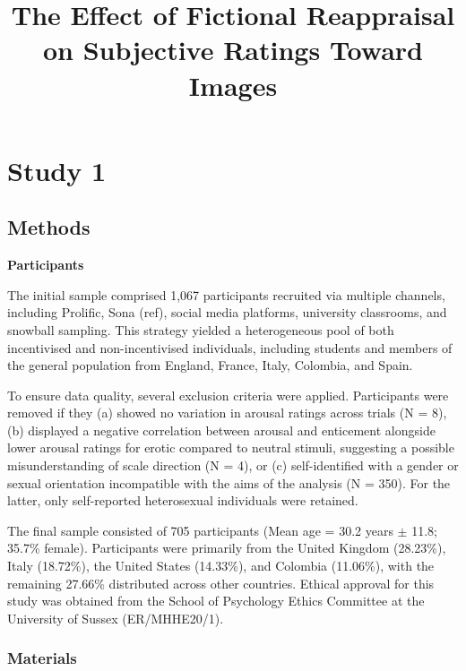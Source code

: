 \documentclass[
  jou,
  floatsintext,
  longtable,
  nolmodern,
  notxfonts,
  notimes,
  colorlinks=true,linkcolor=blue,citecolor=blue,urlcolor=blue]{apa7}
\title{The Effect of Fictional Reappraisal on Subjective Ratings Toward
Images}
\begin{document}
\maketitle


\setcounter{secnumdepth}{-\maxdimen} %

\setlength\LTleft{0pt}

\resetlinenumber[1]

\section{Study 1}\label{study-1}

\subsection{Methods}\label{methods}

\textbf{Participants}

The initial sample comprised 1,067 participants recruited via multiple
channels, including Prolific\textcopyright, Sona (ref), social media
platforms, university classrooms, and snowball sampling. This strategy
yielded a heterogeneous pool of both incentivised and non-incentivised
individuals, including students and members of the general population
from England, France, Italy, Colombia, and Spain.

To ensure data quality, several exclusion criteria were applied.
Participants were removed if they (a) showed no variation in arousal
ratings across trials (N = 8), (b) displayed a negative correlation
between arousal and enticement alongside lower arousal ratings for
erotic compared to neutral stimuli, suggesting a possible
misunderstanding of scale direction (N = 4), or (c) self-identified with
a gender or sexual orientation incompatible with the aims of the
analysis (N = 350). For the latter, only self-reported heterosexual
individuals were retained.

The final sample consisted of 705 participants (Mean age = 30.2 years
\(\pm\) 11.8; 35.7\% female). Participants were primarily from the
United Kingdom (28.23\%), Italy (18.72\%), the United States (14.33\%),
and Colombia (11.06\%), with the remaining 27.66\% distributed across
other countries. Ethical approval for this study was obtained from the
School of Psychology Ethics Committee at the University of Sussex
(ER/MHHE20/1).

\subsubsection{Materials}\label{materials}
\end{document}
